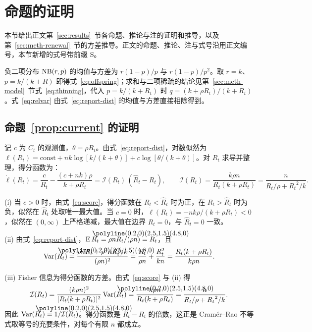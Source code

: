\section{命题的证明}
\label{app:proofs}

本节给出正文第~\ref{sec:results}~节各命题、推论与注的证明和推导，以及第~\ref{sec:meth-renewal}~节的方差推导。正文的命题、推论、注与式号沿用正文编号，本节新增的式号带前缀 S。

负二项分布 $\operatorname{NB}(r,p)$ 的均值与方差为 $r(1-p)/p$ 与 $r(1-p)/p^2$。取 $r=k$、$p=k/(k+R)$ 即得式~\eqref{eq:offspring}；求和与二项稀疏的结论见第~\ref{sec:meth-model}~节式~\eqref{eq:thinning}，代入 $p=k/(k+R_t)$ 时 $q=(k+\rho R_t)/(k+R_t)$。式~\eqref{eq:relvar} 由式~\eqref{eq:report-dist} 的均值与方差直接相除得到。

\subsection{\texorpdfstring{命题~\ref{prop:current} 的证明}{命题 1 的证明}}

记 $c$ 为 $C_t$ 的观测值，$\theta=\rho R_t$。由式~\eqref{eq:report-dist}，对数似然为 $\ell(R_t)=\text{const}+nk\log[k/(k+\theta)]+c\log[\theta/(k+\theta)]$。对 $R_t$ 求导并整理，得分函数为：
\begin{equation}
  \dot\ell(R_t)=\frac{c}{R_t}-\frac{(c+nk)\rho}{k+\rho R_t}
  =\mathcal I(R_t)\,(\widehat R_t-R_t),\qquad
  \mathcal I(R_t)=\frac{k\rho n}{R_t(k+\rho R_t)}=\frac{n}{R_t/\rho+{R_t}^2/k}.
  \label{eq:score}
\end{equation}

(i) 当 $c>0$ 时，由式~\eqref{eq:score}，得分函数在 $R_t<\widehat R_t$ 时为正，在 $R_t>\widehat R_t$ 时为负，似然在 $\widehat R_t$ 处取唯一最大值。当 $c=0$ 时，$\dot\ell(R_t)=-nk\rho/(k+\rho R_t)<0$，似然在 $(0,\infty)$ 上严格递减，最大值在边界 $R_t=0$，与 $\widehat R_t=0$ 一致。

(ii) 由式~\eqref{eq:report-dist}，$\E\widehat R_t=\rho nR_t/(\rho n)=R_t$，且
\begin{equation}
  \Var(\widehat R_t)=\frac{\rho nR_t+\rho^2nR_t^2/k}{(\rho n)^2}=\frac{R_t}{\rho n}+\frac{R_t^2}{kn}=\frac{R_t(k+\rho R_t)}{k\rho n}.
\end{equation}

(iii) Fisher 信息为得分函数的方差。由式~\eqref{eq:score} 与 (ii) 得
\begin{equation}
  \mathcal I(R_t)=\frac{(k\rho n)^2}{[R_t(k+\rho R_t)]^2}\Var(\widehat R_t)=\frac{k\rho n}{R_t(k+\rho R_t)}=\frac{n}{R_t/\rho+{R_t}^2/k}.
\end{equation}
因此 $\Var(\widehat R_t)=1/\mathcal I(R_t)$。得分函数是 $\widehat R_t-R_t$ 的倍数，这正是 Cramér--Rao 不等式取等号的充要条件\citep{casella2002statistical}，对每个有限 $n$ 都成立。


